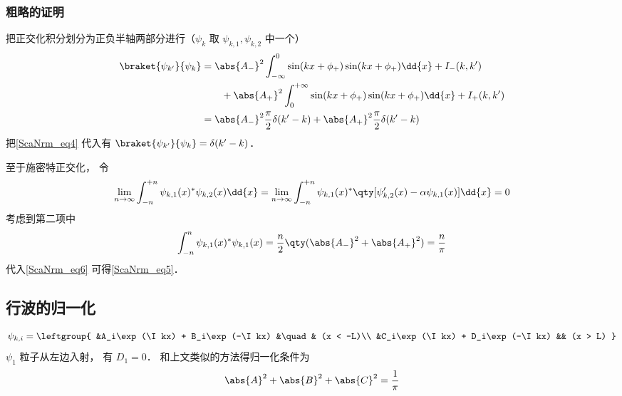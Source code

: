 \subsubsection{粗略的证明}
把正交化积分划分为正负半轴两部分进行（$\psi_{k}$ 取 $\psi_{k,1}, \psi_{k,2}$ 中一个）
\begin{equation}
\begin{aligned}
\braket{\psi_{k'}}{\psi_{k}} &= \abs{A_-}^2\int_{-\infty}^0 \sin(kx + \phi_{+})\sin(kx + \phi_{+}) \dd{x} + I_-(k,k')\\
&\qquad+ \abs{A_+}^2\int_0^{+\infty} \sin(kx + \phi_{+})\sin(kx + \phi_{+}) \dd{x}   + I_+(k,k')\\
&= \abs{A_-}^2\frac{\pi}{2}\delta(k'-k) + \abs{A_+}^2 \frac{\pi}{2} \delta(k'-k)
\end{aligned}
\end{equation}
把\autoref{ScaNrm_eq4} 代入有 $\braket{\psi_{k'}}{\psi_{k}} = \delta(k'-k)$．

至于施密特正交化， 令
\begin{equation}\label{ScaNrm_eq6}
\lim_{n\to\infty}\int_{-n}^{+n} \psi_{k,1}(x)^*\psi_{k,2}(x)\dd{x} = \lim_{n\to\infty}\int_{-n}^{+n} \psi_{k,1}(x)^*\qty[\psi'_{k,2}(x) - \alpha \psi_{k,1}(x)]\dd{x} = 0
\end{equation}
考虑到第二项中
\begin{equation}
\int_{-n}^n \psi_{k,1}(x)^*\psi_{k,1}(x) = \frac{n}{2}\qty(\abs{A_-}^2 + \abs{A_+}^2) = \frac{n}{\pi}
\end{equation}
代入\autoref{ScaNrm_eq6} 可得\autoref{ScaNrm_eq5}．

\subsection{行波的归一化}

\begin{equation}
\psi_{k,i} = \leftgroup{
    &A_i\exp(\I kx) + B_i\exp(-\I kx) &\quad& (x < -L)\\
    &C_i\exp(\I kx) + D_i\exp(-\I kx) && (x > L)
}
\end{equation}
$\psi_1$ 粒子从左边入射， 有 $D_1 = 0$． 和上文类似的方法得归一化条件为
\begin{equation}
\abs{A}^2 + \abs{B}^2 + \abs{C}^2 = \frac{1}{\pi}
\end{equation}

